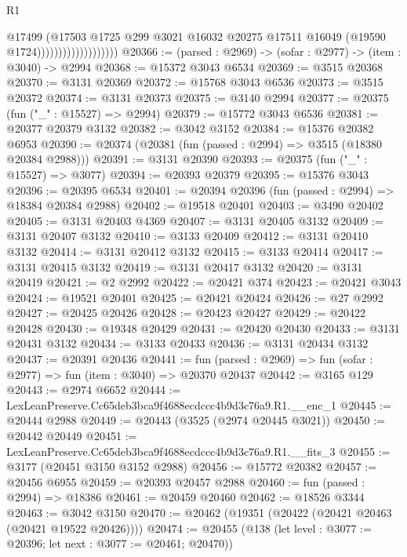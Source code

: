 \begin{lexlean}{R1}
\begin{coremodule}
                                      @17499
                                      (@17503
                                        @1725
                                        @299
                                        @3021
                                        @16032
                                        @20275
                                        @17511
                                        @16049
                                        (@19590 @1724)))))))))))))))))))
@20366 := (parsed : @2969) -> (sofar : @2977) -> (item : @3040) -> @2994
@20368 := @15372 @3043 @6534
@20369 := @3515 @20368
@20370 := @3131 @20369
@20372 := @15768 @3043 @6536
@20373 := @3515 @20372
@20374 := @3131 @20373
@20375 := @3140 @2994
@20377 := @20375 (fun ("_" : @15527) => @2994)
@20379 := @15772 @3043 @6536
@20381 := @20377 @20379 @3132
@20382 := @3042 @3152
@20384 := @15376 @20382 @6953
@20390 := @20374 (@20381 (fun (passed : @2994) => @3515 (@18380 @20384 @2988)))
@20391 := @3131 @20390
@20393 := @20375 (fun ("_" : @15527) => @3077)
@20394 := @20393 @20379
@20395 := @15376 @3043
@20396 := @20395 @6534
@20401 := @20394 @20396 (fun (passed : @2994) => @18384 @20384 @2988)
@20402 := @19518 @20401
@20403 := @3490 @20402
@20405 := @3131 @20403 @4369
@20407 := @3131 @20405 @3132
@20409 := @3131 @20407 @3132
@20410 := @3133 @20409
@20412 := @3131 @20410 @3132
@20414 := @3131 @20412 @3132
@20415 := @3133 @20414
@20417 := @3131 @20415 @3132
@20419 := @3131 @20417 @3132
@20420 := @3131 @20419
@20421 := @2 @2992
@20422 := @20421 @374
@20423 := @20421 @3043
@20424 := @19521 @20401
@20425 := @20421 @20424
@20426 := @27 @2992
@20427 := @20425 @20426
@20428 := @20423 @20427
@20429 := @20422 @20428
@20430 := @19348 @20429
@20431 := @20420 @20430
@20433 := @3131 @20431 @3132
@20434 := @3133 @20433
@20436 := @3131 @20434 @3132
@20437 := @20391 @20436
@20441 := fun (parsed : @2969) => fun (sofar : @2977) => fun (item : @3040) => @20370 @20437
@20442 := @3165 @129
@20443 := @2974 @6652
@20444 := LexLeanPreserve.Cc65deb3bca9f4688ecdccc4b9d3c76a9.R1.__enc_1
@20445 := @20444 @2988
@20449 := @20443 (@3525 (@2974 @20445 @3021))
@20450 := @20442 @20449
@20451 := LexLeanPreserve.Cc65deb3bca9f4688ecdccc4b9d3c76a9.R1.__fits_3
@20455 := @3177 (@20451 @3150 @3152 @2988)
@20456 := @15772 @20382
@20457 := @20456 @6955
@20459 := @20393 @20457 @2988
@20460 := fun (passed : @2994) => @18386
@20461 := @20459 @20460
@20462 := @18526 @3344
@20463 := @3042 @3150
@20470 := @20462 (@19351 (@20422 (@20421 @20463 (@20421 @19522 @20426))))
@20474 := @20455 (@138 (let level : @3077 := @20396; let next : @3077 := @20461; @20470))

\end{coremodule}
\end{lexlean}
